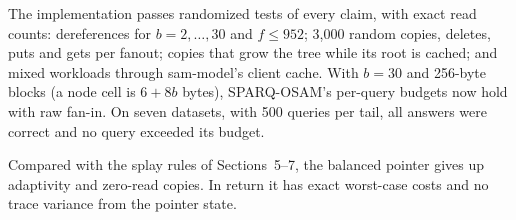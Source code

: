 \documentclass[11pt]{article}
\theoremstyle{definition}
\begin{document}
The implementation passes randomized tests of every claim, with exact read
counts: dereferences for $b=2,\dots,30$ and $f\le 952$; 3{,}000 random
copies, deletes, puts and gets per fanout; copies that grow the tree while its
root is cached; and mixed workloads through sam-model's client cache. With
$b=30$ and 256-byte blocks (a node cell is $6+8b$ bytes), SPARQ-OSAM's
per-query budgets now hold with raw fan-in. On seven datasets, with 500
queries per tail, all answers were correct and no query exceeded its
budget.

Compared with the splay rules of Sections~5--7, the balanced pointer gives up
adaptivity and zero-read copies. In return it has exact worst-case costs and
no trace variance from the pointer state.
\end{document}
